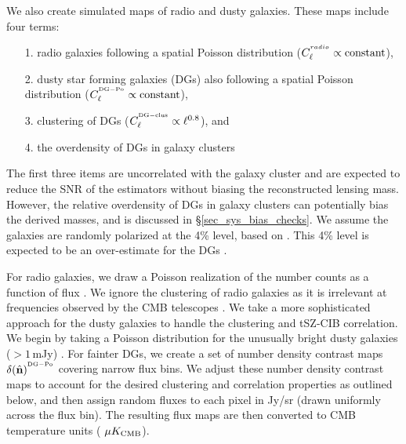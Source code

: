 We also create simulated maps of radio and dusty galaxies. 
These maps include four terms: 
\begin{enumerate}
\item[1.] radio galaxies following a spatial Poisson distribution ($C_{\ell}^{^{radio}} \propto {\rm constant}$),
\item[2.] dusty star forming galaxies (DGs) also following a spatial Poisson distribution ($C_{\ell}^{^{\rm DG-Po}} \propto {\rm constant}$),
\item[3.] clustering of DGs ($C_{\ell}^{^{\rm DG-clus}} \propto  \ell^{0.8}$), and 
\item[4.] the overdensity of DGs in galaxy clusters
\end{enumerate} 
The first three items are uncorrelated with the galaxy cluster and are expected to reduce the SNR of the estimators without biasing the reconstructed lensing mass. However, the relative overdensity of DGs in galaxy clusters can potentially bias the derived masses, and is discussed  in \S\ref{sec_sys_bias_checks}. We assume the galaxies are randomly polarized at the 4\% level, based on \citet{sptpol_delensing_2017}. This 4\% level is expected to be an over-estimate for the DGs \citep{seiffert2007}. 

For radio galaxies, we draw a Poisson realization of the number counts as a function of flux \citep{dezotti2005}. We ignore the clustering of radio galaxies as it is irrelevant at frequencies observed by the CMB telescopes \citep{dezotti2005, george2015}. We take a more sophisticated approach for the dusty galaxies to handle the clustering and tSZ-CIB correlation. We begin by taking a Poisson distribution for the unusually bright dusty galaxies ($>1$\,mJy) \citep{bethermin2011} . For fainter DGs, we create a set of number density contrast maps $\delta(\hat{\textbf{n}})^{^{\rm DG-Po}}$ covering narrow flux bins. We adjust these number density contrast maps to account for the desired clustering and correlation properties as outlined below, and then assign random fluxes to each pixel in Jy/sr (drawn uniformly across the flux bin). The resulting flux maps are then converted to CMB temperature units ($\ \mu K_{\rm CMB}$). 

